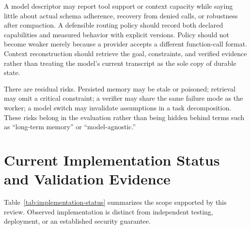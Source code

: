 A model descriptor may report tool support or context capacity while saying little about actual schema adherence, recovery from denied calls, or robustness after compaction. A defensible routing policy should record both declared capabilities and measured behavior with explicit versions. Policy should not become weaker merely because a provider accepts a different function-call format. Context reconstruction should retrieve the goal, constraints, and verified evidence rather than treating the model's current transcript as the sole copy of durable state.

There are residual risks. Persisted memory may be stale or poisoned; retrieval may omit a critical constraint; a verifier may share the same failure mode as the worker; a model switch may invalidate assumptions in a task decomposition. These risks belong in the evaluation rather than being hidden behind terms such as ``long-term memory'' or ``model-agnostic.''

\section{Current Implementation Status and Validation Evidence}
\label{sec:implementation}

Table~\ref{tab:implementation-status} summarizes the scope supported by this review. Observed implementation is distinct from independent testing, deployment, or an established security guarantee.

